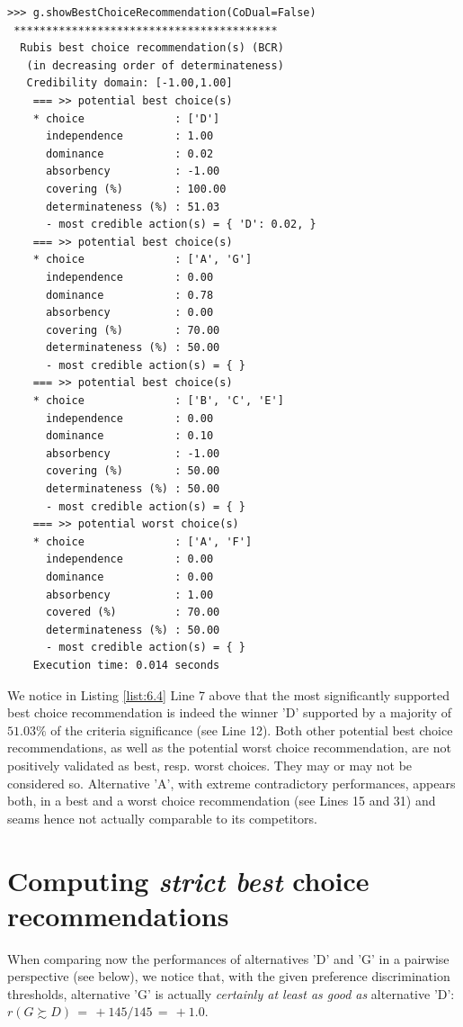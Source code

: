 \begin{lstlisting}[caption={Computing a best choice recommendation},label=list:6.4]
>>> g.showBestChoiceRecommendation(CoDual=False)
 *****************************************
  Rubis best choice recommendation(s) (BCR)
   (in decreasing order of determinateness)   
   Credibility domain: [-1.00,1.00]
    === >> potential best choice(s)
    * choice              : ['D']
      independence        : 1.00
      dominance           : 0.02
      absorbency          : -1.00
      covering (%)        : 100.00
      determinateness (%) : 51.03
      - most credible action(s) = { 'D': 0.02, }
    === >> potential best choice(s)
    * choice              : ['A', 'G']
      independence        : 0.00
      dominance           : 0.78
      absorbency          : 0.00
      covering (%)        : 70.00
      determinateness (%) : 50.00
      - most credible action(s) = { }
    === >> potential best choice(s)
    * choice              : ['B', 'C', 'E']
      independence        : 0.00
      dominance           : 0.10
      absorbency          : -1.00
      covering (%)        : 50.00
      determinateness (%) : 50.00
      - most credible action(s) = { }
    === >> potential worst choice(s) 
    * choice              : ['A', 'F']
      independence        : 0.00
      dominance           : 0.00
      absorbency          : 1.00
      covered (%)         : 70.00
      determinateness (%) : 50.00
      - most credible action(s) = { }
    Execution time: 0.014 seconds
\end{lstlisting}

We notice in Listing \ref{list:6.4} Line 7 above that the most significantly supported best choice recommendation is indeed the \Condorcet winner 'D' supported by a majority of $51.03\%$ of the criteria significance (see Line 12). Both other potential best choice recommendations, as well as the potential worst choice recommendation, are not positively validated as best, resp. worst choices. They may or may not be considered so. Alternative 'A', with extreme contradictory performances, appears both, in a best and a worst choice recommendation (see Lines 15 and 31) and seams hence not actually comparable to its competitors.

\section{Computing \emph{strict best} choice recommendations}
\label{sec:6.4}

When comparing now the performances of alternatives 'D' and 'G' in a pairwise perspective (see below), we notice that, with the given preference discrimination thresholds, alternative 'G' is actually \emph{certainly at least as good as} alternative 'D':  $r(G \succsim D)\, = \, +145/145\, =\, +1.0$.


